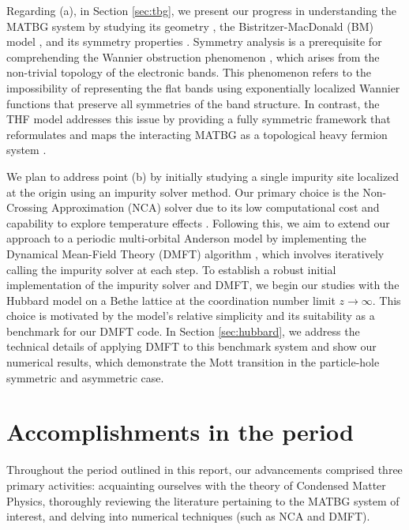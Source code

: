 \documentclass[12pt]{report}
\begin{document}
Regarding (a), in Section \ref{sec:tbg}, we present our progress in understanding the MATBG system by studying its geometry \cite{handbook2019}, the Bistritzer-MacDonald (BM) model \cite{macdonald2011}, and its symmetry properties \cite{thesis_rennella}. Symmetry analysis is a prerequisite for comprehending the Wannier obstruction phenomenon \cite{zou2018}, which arises from the non-trivial topology of the electronic bands. This phenomenon refers to the impossibility of representing the flat bands using exponentially localized Wannier functions that preserve all symmetries of the band structure. In contrast, the THF model addresses this issue by providing a fully symmetric framework that reformulates and maps the interacting MATBG as a topological heavy fermion system \cite{topoheavyfermion2022}.

We plan to address point (b) by initially studying a single impurity site localized at the origin using an impurity solver method. Our primary choice is the Non-Crossing Approximation (NCA) solver due to its low computational cost and capability to explore temperature effects \cite{impurity-solvers}. Following this, we aim to extend our approach to a periodic multi-orbital Anderson model by implementing the Dynamical Mean-Field Theory (DMFT) algorithm \cite{georges1996}, which involves iteratively calling the impurity solver at each step. To establish a robust initial implementation of the impurity solver and DMFT, we begin our studies with the Hubbard model \cite{hubbard1963} on a Bethe lattice at the coordination number limit $z\to\infty$. This choice is motivated by the model's relative simplicity and its suitability as a benchmark for our DMFT code. In Section \ref{sec:hubbard}, we address the technical details of applying DMFT to this benchmark system and show our numerical results, which demonstrate the Mott transition in the particle-hole symmetric and asymmetric case.

\pagebreak


\chapter{Accomplishments in the period} \label{chp:accomplishments}

Throughout the period outlined in this report, our advancements comprised three primary activities: acquainting ourselves with the theory of Condensed Matter Physics, thoroughly reviewing the literature pertaining to the MATBG system of interest, and delving into numerical techniques (such as NCA and DMFT).
\end{document}

